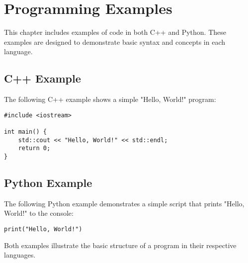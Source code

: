 \section{Programming Examples}

This chapter includes examples of code in both C++ and Python. These examples are designed to demonstrate basic syntax and concepts in each language.

\subsection{C++ Example}
The following C++ example shows a simple "Hello, World!" program:

\begin{lstlisting}[style=cpp]
#include <iostream>

int main() {
    std::cout << "Hello, World!" << std::endl;
    return 0;
}
\end{lstlisting}

\subsection{Python Example}
The following Python example demonstrates a simple script that prints "Hello, World!" to the console:

\begin{lstlisting}[style=python]
print("Hello, World!")
\end{lstlisting}

Both examples illustrate the basic structure of a program in their respective languages.
